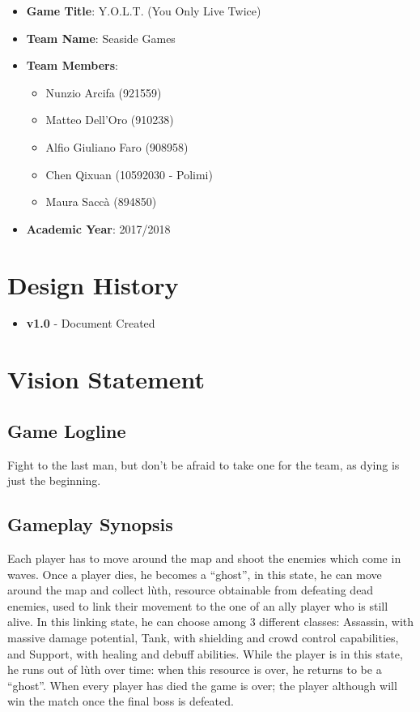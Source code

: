 \documentclass[12pt]{article}
\begin{document}
\vspace*{\fill}
\begin{itemize}
	\item \textbf{Game Title}: Y.O.L.T. (You Only Live Twice)
	\item \textbf{Team Name}: Seaside Games
	\item \textbf{Team Members}:
	\begin{itemize}
		\item Nunzio Arcifa (921559)
		\item Matteo Dell'Oro (910238)
		\item Alfio Giuliano Faro (908958)
		\item Chen Qixuan (10592030 - Polimi)
		\item Maura Saccà (894850)
	\end{itemize}
	\item \textbf{Academic Year}: 2017/2018
\end{itemize}
\vspace*{\fill}

\newpage

\tableofcontents

\newpage

\section{Design History}

\begin{itemize}
	\item \textbf{v1.0} - Document Created
\end{itemize}

\newpage

\section{Vision Statement}

\subsection{Game Logline}

Fight to the last man, but don't be afraid to take one for the team, as dying is just the beginning.

\subsection{Gameplay Synopsis}

Each player has to move around the map and shoot the enemies which come in waves. Once a player dies, he becomes a “ghost”, in this state, he can move around the map and collect lùth, resource obtainable from defeating dead enemies, used to link their movement to the one of an ally player who is still alive. In this linking state, he can choose among 3 different classes: Assassin, with massive damage potential, Tank, with shielding and crowd control capabilities, and Support, with healing and debuff abilities. While the player is in this state, he runs out of lùth over time: when this resource is over, he returns to be a “ghost”. When every player has died the game is over; the player although will win the match once the final boss is defeated.
\end{document}
